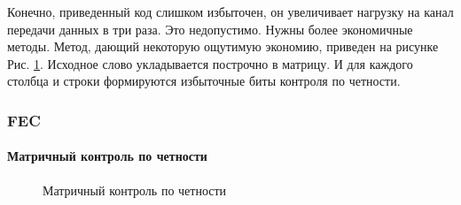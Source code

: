 Конечно, приведенный код слишком избыточен, он увеличивает нагрузку на канал передачи данных в три раза. Это недопустимо. Нужны более экономичные методы. Метод, дающий некоторую ощутимую экономию, приведен на рисунке Рис. \ref{pict:matrix}. Исходное слово укладывается построчно в матрицу. И для каждого столбца и строки формируются избыточные биты контроля по четности.


\begin{frame}
    \frametitle{FEC}
    \framesubtitle{Матричный контроль по четности}
    
    \begin{figure}
        \begin{center}
            \caption{Матричный контроль по четности}\label{pict:matrix}
        \end{center}
    \end{figure} 
\end{frame}



